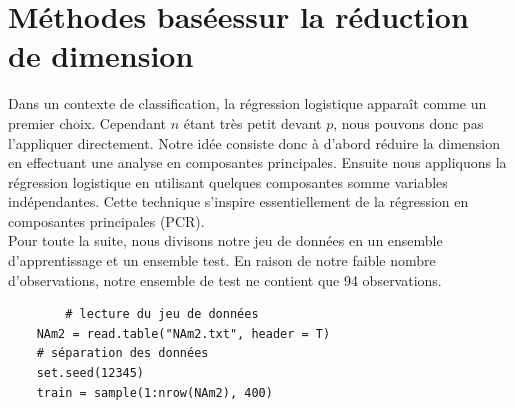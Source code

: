 \documentclass[12pt,a4paper]{article}
\begin{document}
\section{Méthodes baséessur la réduction de dimension}
Dans un contexte de classification, la régression logistique apparaît comme un premier choix. Cependant $n$ étant très petit devant $p$, nous pouvons donc pas l'appliquer directement. Notre idée consiste donc à d'abord réduire la dimension en effectuant une analyse en composantes principales. Ensuite nous appliquons la régression logistique en utilisant quelques composantes somme variables indépendantes. Cette technique s'inspire essentiellement de la régression en composantes principales (PCR).\vspace{2mm}\\
Pour toute la suite, nous divisons notre jeu de données en un ensemble d'apprentissage et un ensemble test. En raison de notre faible nombre d'observations, notre ensemble de test ne contient que 94 observations.\vspace{2mm}
\begin{lstlisting}
		# lecture du jeu de données
	NAm2 = read.table("NAm2.txt", header = T)
	# séparation des données
	set.seed(12345)
	train = sample(1:nrow(NAm2), 400)
\end{lstlisting}
\end{document}
